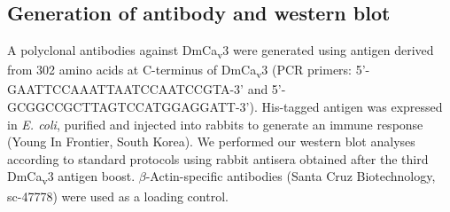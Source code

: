 \subsection*{Generation of antibody and western blot}

A polyclonal antibodies against DmCa\textsubscript{v}3 were generated using antigen derived from 302 amino acids at C-terminus of DmCa\textsubscript{v}3 (PCR primers: 5'-GAATTCCAAATTAATCCAATCCGTA-3' and 5'-GCGGCCGCTTAGTCCATGGAGGATT-3'). 
His-tagged antigen was expressed in \emph{E. coli}, purified and injected into rabbits to generate an immune response (Young In Frontier, South Korea).
We performed our western blot analyses according to standard protocols using rabbit antisera obtained after the third DmCa\textsubscript{v}3 antigen boost. $\beta$-Actin-specific antibodies (Santa Cruz Biotechnology, sc-47778) were used as a loading control.
  